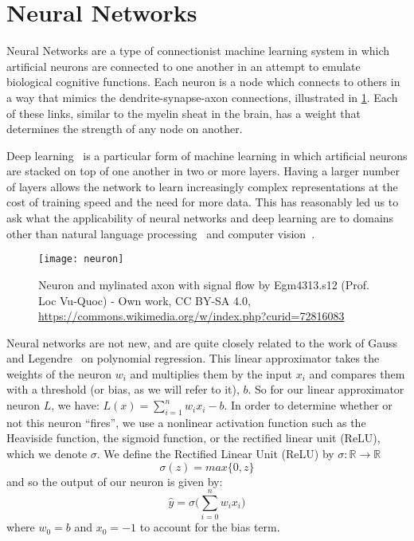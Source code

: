 \section{Neural Networks}\label{intro:nn}
Neural Networks are a type of connectionist machine learning system in which artificial neurons are connected to one another in an attempt to emulate biological cognitive functions.
Each neuron is a node which connects to others in a way that mimics the dendrite-synapse-axon connections, illustrated in \ref{fig:neuron}.
Each of these links, similar to the myelin sheat in the brain, has a weight that determines the strength of any node on another.

Deep learning~\cite{goodfellow2016deep} is a particular form of machine learning in which artificial neurons are stacked on top of one another in two or more layers. 
Having a larger number of layers allows the network to learn increasingly complex representations at the cost of training speed and the need for more data. 
This has reasonably led us to ask what the applicability of neural networks and deep learning are to domains other than natural language processing~\cite{goldberg2016primer} and computer vision~\cite{lecun1998gradient}.

\begin{figure}\label{fig:neuron}
\texttt{[image: neuron]}
\centering
\caption{Neuron and mylinated axon with signal flow by Egm4313.s12 (Prof. Loc Vu-Quoc) - Own work, CC BY-SA 4.0, \url{https://commons.wikimedia.org/w/index.php?curid=72816083}}
\end{figure}

Neural networks are not new, and are quite closely related to the work of Gauss and Legendre~\cite{calin2020deep} on polynomial regression.
This linear approximator takes the weights of the neuron $w_i$ and multiplies them by the input $x_i$ and compares them with a threshold (or bias, as we will refer to it), $b$. 
So for our linear approximator neuron $L$, we have: $L(x) = \sum_{i=1}^{n}w_i x_i - b$.
In order to determine whether or not this neuron ``fires'', we use a nonlinear activation function such as the Heaviside function, the sigmoid function, or the rectified linear unit (ReLU), which we denote $\sigma$. 
We define the Rectified Linear Unit (ReLU) by $\sigma: \mathbb{R} \to \mathbb{R}$ 
$$\sigma(z) = max\{0, z\}$$
and so the output of our neuron is given by:
$$\hat{y} = \sigma\bigg(\sum_{i=0}^{n}w_i x_i\bigg)$$
where $w_0 = b$ and $x_0 = - 1$ to account for the bias term.

